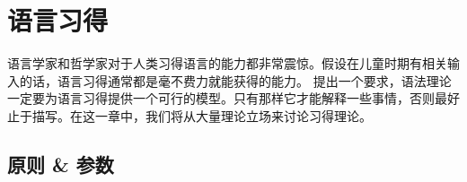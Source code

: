 \chapter{语言习得}
\label{chap-acquisition}

语言学家和哲学家对于人类习得语言的能力都非常震惊。假设在儿童时期有相关输入的话，语言习得通常都是毫不费力就能获得的能力。 \citet[--25]{Chomsky65a}提出一个要求，语法理论一定要为语言习得提供一个可行的模型。只有那样它才能解释一些事情，否则最好止于描写。在这一章中，我们将从大量理论立场来讨论习得理论。

\section{原则 \& 参数}
\label{Abschnitt-PP}\label{sec-pro-drop}

